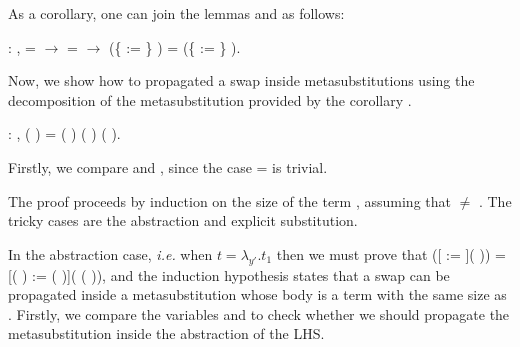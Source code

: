\begin{coqdoccode}
\coqdocemptyline
\end{coqdoccode}
As a corollary, one can join the lemmas  and  as follows:
\begin{coqdoccode}
\coqdocemptyline
\coqdocnoindent
{} : \coqdockw{\ensuremath{\forall}}     ,  =  \ensuremath{\rightarrow}  =  \ensuremath{\rightarrow} (\{ := \} ) = (\{ := \} ).\coqdoceol
\coqdocemptyline
\end{coqdoccode}
Now, we show how to propagated a swap inside metasubstitutions using the decomposition of the metasubstitution provided by the corollary .\newline 
\begin{coqdoccode}
\coqdocemptyline
\coqdocnoindent
{} : \coqdockw{\ensuremath{\forall}}     ,    (   ) =  (   ) (   ) (   ).\coqdoceol
\end{coqdoccode}
 Firstly, we compare  and , since the case  =  is trivial.
\begin{coqdoccode}
\end{coqdoccode}
The proof proceeds by induction on the size of the term , assuming that  \ensuremath{\not=} . The tricky cases are the abstraction and explicit substitution. 
\begin{coqdoccode}
\end{coqdoccode}
In the abstraction case, {\it i.e.} when $t = \lambda_{y'}.t_1$ then we must prove that    ([ := ](  )) = [(   ) := (   )](   (  )), and the induction hypothesis states that a swap can be propagated inside a metasubstitution whose body is a term with the same size as . Firstly, we compare the variables  and  to check whether we should propagate the metasubstitution inside the abstraction of the LHS. 
